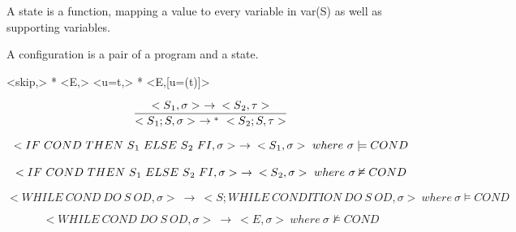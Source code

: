 \begin{definition}
	A state is a function, mapping a value to every variable in var(S) as well as supporting variables.
\end{definition}

\begin{definition}
	A configuration is a pair of a program and a state.
\end{definition}

<skip,\textsigma{}> \textrightarrow{}* <E,\textsigma{}>
<u=t,\textsigma{}> \textrightarrow{}* <E,\textsigma{}[u=\textsigma{}(t)]>

\begin{equation}
	\dfrac{<S\textsubscript{1},\sigma{}>\ \rightarrow{} <S\textsubscript{2},\tau>}{<S\textsubscript{1};S,\sigma{}>\ \rightarrow{}^*\ <S\textsubscript{2};S,\tau{}>}
\end{equation}

\begin{equation}
	<IF\ COND\ THEN\ S\textsubscript{1}\ ELSE\ S\textsubscript{2}\ FI,\sigma{}>\ \rightarrow{} <S\textsubscript{1},\sigma{}>\ where\ \sigma{} \models{} COND
\end{equation}

\begin{equation}
	<IF\ COND\ THEN\ S\textsubscript{1}\ ELSE\ S\textsubscript{2}\ FI,\sigma{}>\ \rightarrow{} <S\textsubscript{2},\sigma{}>\ where\ \sigma{} \nvDash{} COND
\end{equation}

\begin{equation}
	<WHILE\ COND\ DO\ S\ OD,\sigma{}>\ \rightarrow{}\ <S;WHILE\ CONDITION\ DO\ S\ OD,\sigma{}>\ where\ \sigma{} \vDash{} COND
\end{equation}

\begin{equation}
	<WHILE\ COND\ DO\ S\ OD,\sigma{}>\ \rightarrow{}\ <E,\sigma{}>\ where\ \sigma{} \nvDash{} COND
\end{equation}




